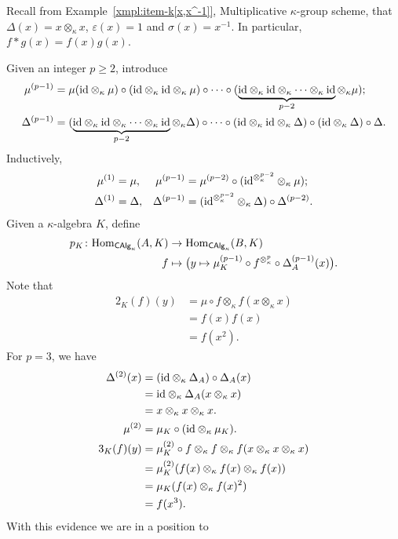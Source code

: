 Recall from Example~\ref{xmpl:item-k[x,x^-1]}, Multiplicative $\kappa$-group scheme, that $\Delta(x)=x\otimes_\kappa x$, $\varepsilon(x)=1$ and $\sigma(x)=x^{-1}$. In particular, $f*g(x)=f(x)g(x)$.

Given an integer $p\ge2$, introduce
\begin{align*}
    \mu^{(p-1)} &=
        \mu(\text{\rm id}\otimes_\kappa\mu)
            \circ(\text{\rm id}\otimes_\kappa\text{\rm id}\otimes_\kappa\mu) \circ\cdots\circ
            (\underbrace{
                \text{\rm id}\otimes_\kappa\text{\rm id}\otimes_\kappa
                \cdots\otimes_\kappa\text{\rm id}}_{p-2}
            \otimes_\kappa\mu); \\
    \Delta^{(p-1)} &=
        (\underbrace{\text{\rm id}\otimes_\kappa\text{\rm id}\otimes_\kappa
            \cdots\otimes_\kappa\text{\rm id}}_{p-2}\otimes_\kappa\Delta)
            \circ\cdots\circ(\text{\rm id}\otimes_\kappa\text{\rm id}\otimes_\kappa\Delta)
            \circ(\text{\rm id}\otimes_\kappa\Delta)
            \circ\Delta.
\end{align*}
Inductively,
\begin{align*}
    \mu^{(1)} &= \mu,
        &\mu^{(p-1)} &= \mu^{(p-2)}\circ(\text{\rm id}^{\otimes_\kappa^{p-2}}
            \otimes_\kappa\mu);\\
    \Delta^{(1)} &= \Delta,
        &\Delta^{(p-1)} &= (\text{\rm id}^{\otimes_\kappa^{p-2}}\otimes_\kappa\Delta)
            \circ\Delta^{(p-2)}.
\end{align*}
Given a $\kappa$-algebra $K$, define
\begin{align*}
    p_K\colon{\rm Hom}_{\mathsf{CAlg}_\kappa}(A,K)
        &\to{\rm Hom}_{\mathsf{CAlg}_\kappa}(B,K)\\
    f
        &\mapsto\big(y\mapsto
            \mu_K^{(p-1)}
                \circ f^{\otimes_\kappa^p}
                \circ\Delta_A^{(p-1)}(x)\big).
\end{align*}
Note that
\begin{align*}
    2_K(f)(y) &= \mu\circ f\otimes_\kappa f(x\otimes_\kappa x)\\
        &= f(x)f(x)\\
        &= f(x^2).
\end{align*}
For $p=3$, we have
\begin{align*}
    \Delta^{(2)}(x) &= (\text{\rm id}\otimes_\kappa\Delta_A)\circ\Delta_A(x)\\
        &= \text{\rm id}\otimes_\kappa\Delta_A(x\otimes_\kappa x)\\
        &= x\otimes_\kappa x\otimes_\kappa x.\\
    \mu^{(2)} &= \mu_K\circ(\text{\rm id}\otimes_\kappa\mu_K).\\
    3_K(f)(y) &= \mu_K^{(2)}
        \circ f\otimes_\kappa f\otimes_\kappa f
            (x\otimes_\kappa x\otimes_\kappa x)\\
        &= \mu_K^{(2)}(f(x)\otimes_\kappa f(x)\otimes_\kappa f(x))\\
        &= \mu_K(f(x)\otimes_\kappa f(x)^2)\\
        &= f(x^3).
\end{align*}
With this evidence we are in a position to


